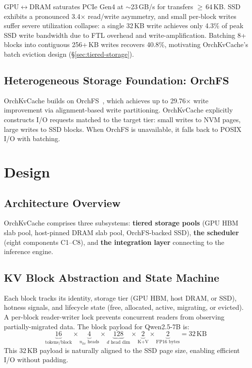 \documentclass[conference]{IEEEtran}
\begin{document}
GPU$\leftrightarrow$DRAM saturates PCIe Gen4 at ${\sim}$23\,GB/s for transfers $\geq$\,64\,KB. SSD exhibits a pronounced 3.4$\times$ read/write asymmetry, and small per-block writes suffer severe utilization collapse: a single 32\,KB write achieves only 4.3\% of peak SSD write bandwidth due to FTL overhead and write-amplification. Batching 8+ blocks into contiguous 256+\,KB writes recovers 40.8\%, motivating OrchKvCache's batch eviction design (\S\ref{sec:tiered-storage}).

\subsection{Heterogeneous Storage Foundation: OrchFS}

OrchKvCache builds on OrchFS~\cite{orchfs}, which achieves up to 29.76$\times$ write improvement via alignment-based write partitioning. OrchKvCache explicitly constructs I/O requests matched to the target tier: small writes to NVM pages, large writes to SSD blocks. When OrchFS is unavailable, it falls back to POSIX I/O with batching.




\section{Design}

\subsection{Architecture Overview}

OrchKvCache comprises three subsystems: \textbf{tiered storage pools} (GPU HBM slab pool, host-pinned DRAM slab pool, OrchFS-backed SSD), \textbf{the scheduler} (eight components C1--C8), and \textbf{the integration layer} connecting to the inference engine.

\subsection{KV Block Abstraction and State Machine}

Each block tracks its identity, storage tier (GPU HBM, host DRAM, or SSD), hotness signals, and lifecycle state (free, allocated, active, migrating, or evicted). A per-block reader-writer lock prevents concurrent readers from observing partially-migrated data. The block payload for Qwen2.5-7B is:
\[
\underbrace{16}_{\text{tokens/block}} \times \underbrace{4}_{n_{kv}\text{ heads}} \times \underbrace{128}_{d\text{ head dim}} \times \underbrace{2}_{\text{K+V}} \times \underbrace{2}_{\text{FP16 bytes}} = 32\,\text{KB}
\]
This 32\,KB payload is naturally aligned to the SSD page size, enabling efficient I/O without padding.
\end{document}

